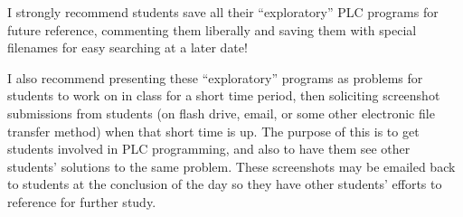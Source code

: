 








 






I strongly recommend students save all their ``exploratory'' PLC programs for future reference, commenting them liberally and saving them with special filenames for easy searching at a later date!

\vskip 10pt

I also recommend presenting these ``exploratory'' programs as problems for students to work on in class for a short time period, then soliciting screenshot submissions from students (on flash drive, email, or some other electronic file transfer method) when that short time is up.  The purpose of this is to get students involved in PLC programming, and also to have them see other students' solutions to the same problem.  These screenshots may be emailed back to students at the conclusion of the day so they have other students' efforts to reference for further study.




